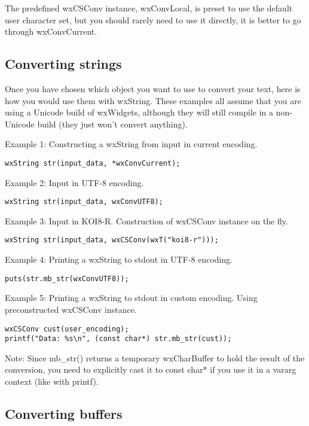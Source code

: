 The predefined wxCSConv instance, wxConvLocal, is preset to use the
default user character set, but you should rarely need to use it directly,
it is better to go through wxConvCurrent.

\subsection{Converting strings}

Once you have chosen which object you want to use to convert your text,
here is how you would use them with wxString. These examples all assume
that you are using a Unicode build of wxWidgets, although they will still
compile in a non-Unicode build (they just won't convert anything).

Example 1: Constructing a wxString from input in current encoding.

\begin{verbatim}
wxString str(input_data, *wxConvCurrent);
\end{verbatim}

Example 2: Input in UTF-8 encoding.

\begin{verbatim}
wxString str(input_data, wxConvUTF8);
\end{verbatim}

Example 3: Input in KOI8-R. Construction of wxCSConv instance on the fly.

\begin{verbatim}
wxString str(input_data, wxCSConv(wxT("koi8-r")));
\end{verbatim}

Example 4: Printing a wxString to stdout in UTF-8 encoding.

\begin{verbatim}
puts(str.mb_str(wxConvUTF8));
\end{verbatim}

Example 5: Printing a wxString to stdout in custom encoding.
Using preconstructed wxCSConv instance.

\begin{verbatim}
wxCSConv cust(user_encoding);
printf("Data: %s\n", (const char*) str.mb_str(cust));
\end{verbatim}

Note: Since mb\_str() returns a temporary wxCharBuffer to hold the result
of the conversion, you need to explicitly cast it to const char* if you use
it in a vararg context (like with printf).

\subsection{Converting buffers}


